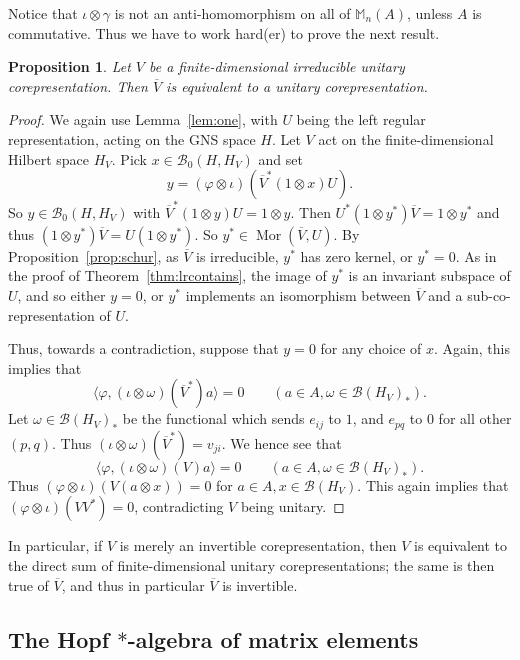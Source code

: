 \documentclass[twoside,a4paper,12pt]{article}
\theoremstyle{plain}
\newtheorem{proposition}{Proposition}[section]
\theoremstyle{definition}
\newcommand{\ip}[2]{\langle #1,#2 \rangle}
\newcommand{\mc}{\mathcal}
\newcommand{\mor}{\operatorname{Mor}}
\begin{document}
Notice that $\iota\otimes\gamma$ is not an anti-homomorphism on all of
$\mathbb M_n(A)$, unless $A$ is commutative.  Thus we have to work hard(er)
to prove the next result.

\begin{proposition}\label{prop:conjunitary}
Let $V$ be a finite-dimensional irreducible unitary corepresentation.
Then $\overline{V}$ is equivalent to a unitary corepresentation.
\end{proposition}
\begin{proof}
We again use Lemma~\ref{lem:one}, with $U$ being the left regular
representation, acting on the GNS space $H$.  Let $V$ act on the 
finite-dimensional Hilbert space $H_V$.  Pick $x\in\mc B_0(H,H_V)$ and set
\[ y = (\varphi\otimes\iota)(\overline{V}^*(1\otimes x)U). \]
So $y\in\mc B_0(H,H_V)$ with $\overline{V}^*(1\otimes y)U=1\otimes y$.
Then $U^*(1\otimes y^*)\overline{V} = 1\otimes y^*$ and thus
$(1\otimes y^*)\overline{V} = U(1\otimes y^*)$.  So $y^* \in \mor(\overline{V},
U)$.  By Proposition~\ref{prop:schur}, as $\overline{V}$ is irreducible,
$y^*$ has zero kernel, or $y^*=0$.  As in the proof of
Theorem~\ref{thm:lrcontains}, the image of $y^*$ is an invariant subspace of
$U$, and so either $y=0$, or $y^*$ implements an isomorphism between
$\overline{V}$ and a sub-co-representation of $U$.

Thus, towards a contradiction, suppose that $y=0$ for any choice of $x$.
Again, this implies that
\[ \ip{\varphi}{(\iota\otimes\omega)(\overline{V}^*)a} = 0
\qquad (a\in A, \omega\in\mc B(H_V)_*). \]
Let $\omega\in\mc B(H_V)_*$ be the functional which sends $e_{ij}$ to $1$,
and $e_{pq}$ to $0$ for all other $(p,q)$.  Thus 
$(\iota\otimes\omega)(\overline{V}^*) = v_{ji}$.  We hence see that
\[ \ip{\varphi}{(\iota\otimes\omega)(V)a} = 0
\qquad (a\in A, \omega\in\mc B(H_V)_*). \]
Thus $(\varphi\otimes\iota)(V(a\otimes x))=0$ for $a\in A, x\in\mc B(H_V)$.
This again implies that $(\varphi\otimes\iota)(VV^*)=0$, contradicting
$V$ being unitary.
\end{proof}

In particular, if $V$ is merely an invertible corepresentation, then
$V$ is equivalent to the direct sum of finite-dimensional unitary
corepresentations; the same is then true of $\overline V$, and thus in
particular $\overline V$ is invertible.


\subsection{The Hopf $*$-algebra of matrix elements}
\end{document}
